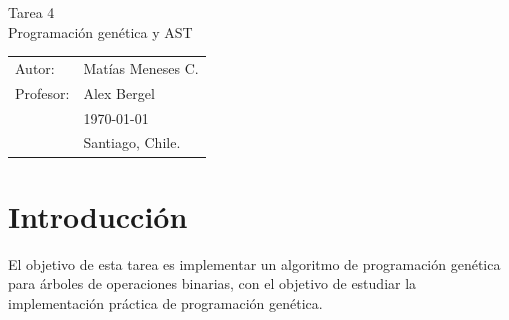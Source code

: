 \documentclass[11pt,letterpaper]{article}
\begin{document}
\newpage
\pagestyle{fancy}
\fancyhf{}
\vspace*{6cm}
\begin{center}
\Huge  {Tarea 4}\\
\vspace{1cm}
\huge {Programación genética y AST}\\
\end{center}
\vfill
\begin{flushright}
\begin{tabular}{ll}
Autor: & Matías Meneses C.\\
Profesor: & Alex Bergel\\
& \today\\
& Santiago, Chile.
\end{tabular}
\end{flushright}

\newpage
\pagestyle{fancy}
\fancyhf{}

\fancyhead[R]{\small \rm \textbf{\thepage}} %



\renewcommand{\sectionmark}[1]{\markright{\thesection.\ #1}}
\renewcommand{\headrulewidth}{0.5pt}
\renewcommand{\footrulewidth}{0.5pt}


\tableofcontents

\newpage
\section{Introducción}
El objetivo de esta tarea es implementar un algoritmo de programación genética para 
árboles de operaciones binarias, con el objetivo de estudiar la implementación práctica de 
programación genética.
\end{document}
